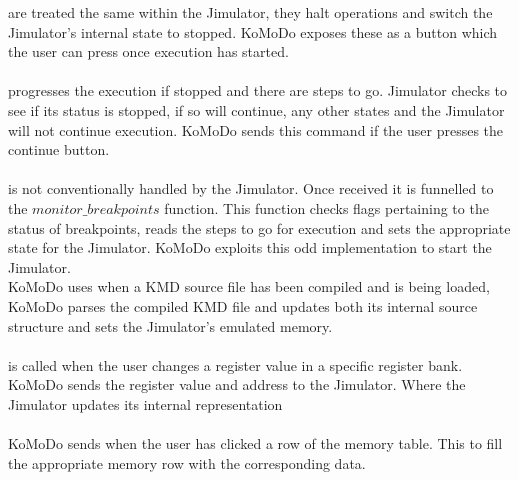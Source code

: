 %
 are treated the same within the Jimulator, they halt operations and switch the Jimulator's internal state to stopped. KoMoDo exposes these as a button which the user can press once execution has started.\\\\
%
 progresses the execution if stopped and there are steps to go. Jimulator checks to see if its status is stopped, if so will continue, any other states and the Jimulator will not continue execution. KoMoDo sends this command if the user presses the continue button.\\\\
%
 is not conventionally handled by the Jimulator. Once received it is funnelled to the $monitor\_breakpoints$ function. This function checks flags pertaining to the status of breakpoints, reads the steps to go for execution and sets the appropriate state for the Jimulator. KoMoDo exploits this odd implementation to start the Jimulator.\\
%
%
%
%
KoMoDo uses  when a KMD source file has been compiled and is being loaded, KoMoDo parses the compiled KMD file and updates both its internal source structure and sets the Jimulator's emulated memory.\\\\
%
 is called when the user changes a register value in a specific register bank. KoMoDo sends the register value and address to the Jimulator. Where the Jimulator updates its internal representation\\\\
%
KoMoDo sends  when the user has clicked a row of the memory table. This to fill the appropriate memory row with the corresponding data.\\\\
